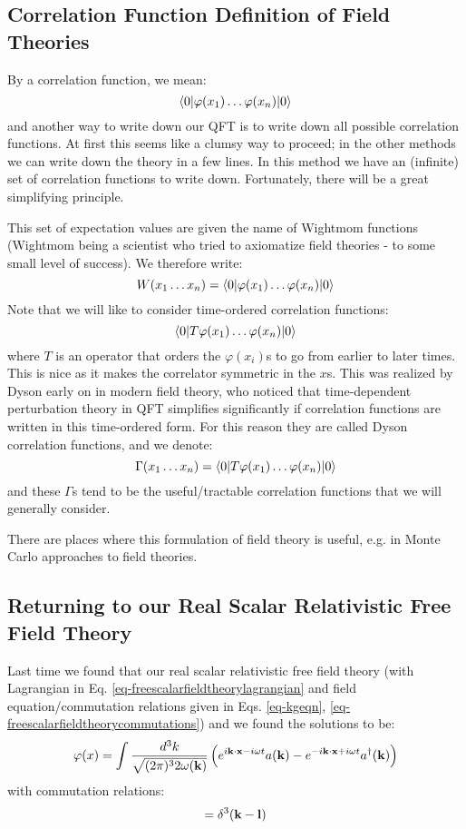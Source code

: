 \subsection{Correlation Function Definition of Field Theories}
By a correlation function, we mean:
\begin{equation}
    \bra{0}\varphi(x_1) \ldots \varphi(x_n)\ket{0}
\end{equation}
and another way to write down our QFT is to write down all possible correlation functions. At first this seems like a clumsy way to proceed; in the other methods we can write down the theory in a few lines. In this method we have an (infinite) set of correlation functions to write down. Fortunately, there will be a great simplifying principle.

This set of expectation values are given the name of Wightmom functions (Wightmom being a scientist who tried to axiomatize field theories - to some small level of success). We therefore write:
\begin{equation}
    W(x_1 \ldots x_n) = \bra{0}\varphi(x_1) \ldots \varphi(x_n)\ket{0}
\end{equation}
Note that we will like to consider time-ordered correlation functions:
\begin{equation}
    \bra{0}T\varphi(x_1) \ldots \varphi(x_n)\ket{0}
\end{equation}
where $T$ is an operator that orders the $\varphi(x_i)$s to go from earlier to later times. This is nice as it makes the correlator symmetric in the $x$s. This was realized by Dyson early on in modern field theory, who noticed that time-dependent perturbation theory in QFT simplifies significantly if correlation functions are written in this time-ordered form. For this reason they are called Dyson correlation functions, and we denote:
\begin{equation}
    \Gamma(x_1 \ldots x_n) = \bra{0}T\varphi(x_1) \ldots \varphi(x_n)\ket{0}
\end{equation}
and these $\Gamma$s tend to be the useful/tractable correlation functions that we will generally consider.

There are places where this formulation of field theory is useful, e.g. in Monte Carlo approaches to field theories.

\subsection{Returning to our Real Scalar Relativistic Free  Field Theory}
Last time we found that our real scalar relativistic free field theory (with Lagrangian in Eq. \eqref{eq-freescalarfieldtheorylagrangian} and field equation/commutation relations given in Eqs. \eqref{eq-kgeqn}, \eqref{eq-freescalarfieldtheorycommutations}) and we found the solutions to be:
\begin{equation}
    \varphi(x) = \int \frac{d^3k}{\sqrt{(2\pi)^3 2\omega(\v{k})}}\left(e^{i\v{k}\cdot \v{x} - i\omega t}a(\v{k}) - e^{-i\v{k}\cdot\v{x} + i\omega t}a^\dag(\v{k})\right)
\end{equation}
with commutation relations:
\begin{equation}
    [a(\v{k}), a^\dag(\v{l})] = \delta^3(\v{k} - \v{l})
\end{equation}

